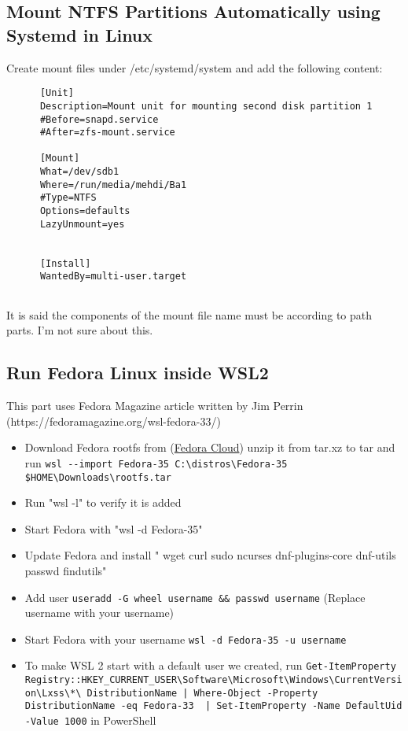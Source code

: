 \documentclass{article}
\begin{document}
  \subsection{Mount NTFS Partitions Automatically using Systemd in Linux}
    Create mount files under /etc/systemd/system and add the following content:
    \begin{lstlisting}
      [Unit]
      Description=Mount unit for mounting second disk partition 1
      #Before=snapd.service
      #After=zfs-mount.service
      
      [Mount]
      What=/dev/sdb1
      Where=/run/media/mehdi/Ba1
      #Type=NTFS
      Options=defaults
      LazyUnmount=yes
      
      
      [Install]
      WantedBy=multi-user.target
           
    \end{lstlisting}
    It is said the components of the mount file name must be according to path parts. I'm not sure about this. 

    \subsection{Run Fedora Linux inside WSL2}
    This part uses Fedora Magazine article written by Jim Perrin (https://fedoramagazine.org/wsl-fedora-33/)

    
   
      \begin{itemize}
        \item Download Fedora rootfs from (\href{https://github.com/fedora-cloud/docker-brew-fedora/tree/35/x86_64}{Fedora Cloud}) unzip it from tar.xz to tar and run \lstinline{wsl --import Fedora-35 C:\distros\Fedora-35 $HOME\Downloads\rootfs.tar}
        
        \item Run "wsl -l" to verify it is added
        \item Start Fedora with "wsl -d Fedora-35"
        \item Update Fedora and install " wget curl sudo ncurses dnf-plugins-core dnf-utils passwd findutils"
        \item Add user \lstinline{useradd -G wheel username && passwd username} (Replace username with your username)
        \item Start Fedora with your username \lstinline{wsl -d Fedora-35 -u username}
        \item To make WSL 2 start with a default user we created, run \lstinline{Get-ItemProperty Registry::HKEY_CURRENT_USER\Software\Microsoft\Windows\CurrentVersion\Lxss\*\ DistributionName | Where-Object -Property DistributionName -eq Fedora-33  | Set-ItemProperty -Name DefaultUid -Value 1000} in PowerShell
        
      \end{itemize}
\end{document}
